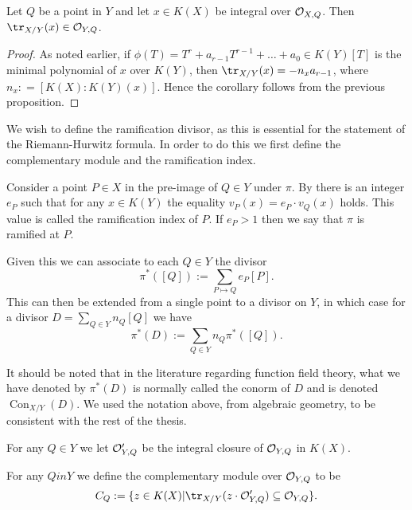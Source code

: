     \begin{cor}\label{traceinclosure}
    Let $Q$ be a point in $Y$ and let $x\in K(X)$ be integral over ${\cal O}_{X,Q}$.
    Then $\tr_{X/Y}(x)\in \cO_{Y,Q}$.
    \end{cor}
    \begin{proof}
    As noted earlier, if $\phi(T)=T^r+a_{r-1}T^{r-1} + \ldots + a_0\in K(Y)[T]$ is the minimal polynomial of $x$ over $K(Y)$, then $\tr_{X/Y}(x)=-n_xa_{r-1}$, where $n_x : = [K(X):K(Y)(x)]$.
    Hence the corollary follows from the previous proposition.
    \end{proof}


We wish to define the ramification divisor, as this is essential for the statement of the Riemann-Hurwitz formula.
In order to do this we first define the complementary module and the ramification index.


    \begin{defn}\label{definitionramificationdivisor}
    Consider a point $P\in X$ in the pre-image of $Q\in Y$ under $\pi$.
    By \cite[Prop. 3.1.4]{stichtenoth} there is an integer $e_P$ such that for any $x\in K(Y)$ the equality $v_P(x) = e_P\cdot v_Q(x)$ holds.
    This value is called the ramification index of $P$.
    If $e_P>1$ then we say that $\pi$ is ramified at $P$.
    \end{defn}

Given this we can associate to each $Q\in Y$ the divisor
    \[
    \pi^*([Q]) := \sum_{P\mapsto Q} e_P [P].
    \]
This can then be extended from a single point to a divisor on $Y$, in which case for a divisor $D = \sum_{Q\in Y}n_Q [Q]$ we have
    \[
    \pi^*(D) := \sum_{Q\in Y}n_Q \pi^*([Q]).
    \]

    \begin{rem}
    It should be noted that in the literature regarding function field theory, what we have denoted by $\pi^*(D)$ is normally called the conorm of $D$ and is denoted $\operatorname{Con}_{X/Y}(D)$. 
    We used the notation above, from algebraic geometry, to be consistent with the rest of the thesis.
    \end{rem}

    For any $Q\in Y$ we let ${\cal O}_{Y,Q}'$ be the integral closure of ${\cal O}_{Y,Q}$ in $K(X)$.

    \begin{defn}
    For any $Q in Y$ we define the complementary module over ${\cal O}_{Y,Q}$ to be
        \[
        C_Q :=\{z\in K(X) | \tr_{X/Y}(z\cdot \cO_{Y,Q}') \subseteq \cO_{Y,Q}\}.
        \]
    \end{defn}


